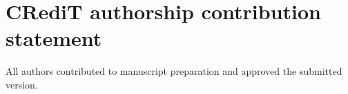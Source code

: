 \section*{CRediT authorship contribution statement}
\label{sec:authorship_contribution}
All authors contributed to manuscript preparation and approved the submitted version.
